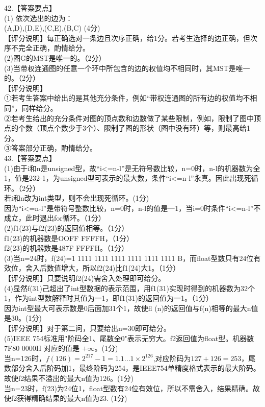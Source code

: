 42.【答案要点】 \\
(1) 依次选出的边为： \\
(A,D),(D,E),(C,E),(B,C) (4分) \\
【评分说明】每正确选对一条边且次序正确，给1分。若考生选择的边正确，但次序不完全正确，酌情给分。 \\
(2)图G的MST是唯一的。（2分） \\
(3)当带权连通图的任意一个环中所包含的边的权值均不相同时，其MST是唯一的。（2分） \\
【评分说明】 \\
①若考生答案中给出的是其他充分条件，例如“带权连通图的所有边的权值均不相同”，同样给分。 \\
②若考生给出的充分条件对图的顶点数和边数做了某些限制，例如，限制了图中顶点的个数（顶点个数少于3个）、限制了图的形状（图中没有环）等，则最高给1分。 \\
③答案部分正确，酌情给分。 \\

43.【答案要点】 \\
(1)由于i和n是unsigned型，故“i<=n-l”是无符号数比较，n=0时，n-l的机器数为全1，值是232-1，为unsigned型可表示的最大数，条件“i<=n-l”永真。因此出现死循环。（2分） \\
若i和n改为int类型，则不会出现死循环。(1分) \\
因为“i<=n-l”是带符号整数比较，n=0时，n-l的值是一1，当i=0时条件“i<=n-l”不成立，此时退出for循环。（1分） \\
(2)f1(23)与f2(23)的返回值相等。（1分） \\
f1(23)的机器数是OOFF FFFFH，（1分） \\
f2(23)的机器数是487F FFFFH。（1分） \\
(3)当n=24时，f(24)=1 1111 1111 1111 1111 1111 1111 B，而float型数只有24位有效位，舍入后数值增大，所以f2(24)比f1(24)大1。（1分） \\
【评分说明】只要说明f2(24)需舍入处理即可给分。 \\
(4)显然f(31)己超出了int型数据的表示范围，用f1(31)实现时得到的机器数为32个1，作为int型数解释时其值为一1，即f1(31)的返回值为一1。（1分） \\
因为int型最大可表示数是0后面加31个1，故使fl (n)的返回值与f(n)相等的最大n值是30。(1分) \\
【评分说明】对于第二问，只要给出n=30即可给分。 \\
(5)IEEE 754标准用"阶码全1、尾数全0"表示无穷大。f2返回值为float型。机器数7F80 0000H
对应的值是 $+\infty$。(1分) \\
当n=126时，$f(126)=2^{217}-1=1.1...1\times2^{126}$,对应阶码为$127+126=253$，尾数部分舍入后阶码加1，最终阶码为254，是IEEE754单精度格式表示的最大阶码。故使f2结果不溢出的最大n值为126。(1分) \\
当n=23时，f(23)为24位1，float型数有24位有效位，所以不需舍入，结果精确。故使f2获得精确结果的最大n值为23. (1分)


